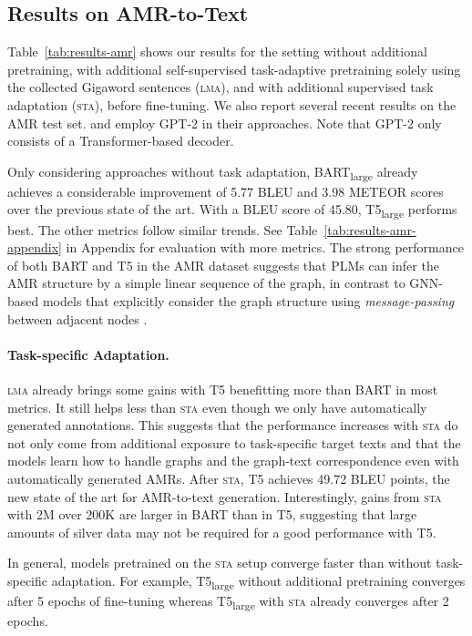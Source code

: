 \documentclass[11pt]{article}
\begin{document}
\begin{table}[t]
\subsection{Results on AMR-to-Text}
\label{sec:amr}
Table~\ref{tab:results-amr} shows our results for the setting without additional pretraining, with additional self-supervised task-adaptive pretraining solely using the collected Gigaword sentences (\textsc{lma}), and with additional supervised task adaptation (\textsc{sta}), before fine-tuning. We also report several recent results on the AMR test set. \citet{mager2020gpttoo} and \citet{harkous2020text} employ GPT-2 in their approaches. Note that GPT-2 only consists of a Transformer-based decoder.

Only considering approaches without task adaptation, BART\textsubscript{large} already achieves a considerable improvement of 5.77 BLEU and 3.98 METEOR scores over the previous state of the art. With a BLEU score of 45.80, T5\textsubscript{large} performs best. The other metrics follow similar trends. See Table~\ref{tab:results-amr-appendix} in Appendix for evaluation with more metrics. The strong performance of both BART and T5 in the AMR dataset suggests that PLMs can infer the AMR structure by a simple linear sequence of the graph, in contrast to GNN-based models that explicitly consider the graph structure using \emph{message-passing} between adjacent nodes \cite{beck-etal-2018-acl2018}.



\paragraph{Task-specific Adaptation.}
\textsc{lma}
already brings some gains with T5 benefitting more than BART in most metrics.
It still helps less than \textsc{sta} even though we only have automatically generated annotations.
This suggests that the performance increases with \textsc{sta} do not only come from additional exposure to task-specific target texts and that the models learn how to handle graphs and the graph-text correspondence even with automatically generated AMRs. After \textsc{sta}, T5 achieves 49.72 BLEU points, the new state of the art for AMR-to-text generation. Interestingly, gains from \textsc{sta} with 2M over 200K are larger in BART than in T5, suggesting that large amounts of silver data may not be required for a good performance with T5. 

In general, models pretrained on the \textsc{sta} setup converge faster than without task-specific adaptation. For example, T5\textsubscript{large} without additional pretraining converges after 5 epochs of fine-tuning whereas T5\textsubscript{large} with \textsc{sta} already converges after 2 epochs.




\end{table}
\end{document}
